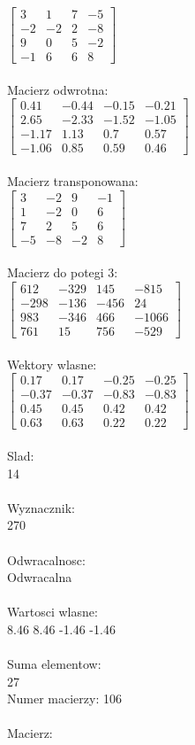 \documentclass[a4paper,12pt]{article}
\begin{document}
$\begin{bmatrix} 3&1&7&-5\\-2&-2&2&-8\\9&0&5&-2\\-1&6&6&8 \end{bmatrix}$
\\
\\
Macierz odwrotna:\\

$\begin{bmatrix} 0.41&-0.44&-0.15&-0.21\\2.65&-2.33&-1.52&-1.05\\-1.17&1.13&0.7&0.57\\-1.06&0.85&0.59&0.46 \end{bmatrix}$
\\
\\
Macierz transponowana:\\

$\begin{bmatrix} 3&-2&9&-1\\1&-2&0&6\\7&2&5&6\\-5&-8&-2&8 \end{bmatrix}$
\\
\\
Macierz do potegi 3:\\

$\begin{bmatrix} 612&-329&145&-815\\-298&-136&-456&24\\983&-346&466&-1066\\761&15&756&-529 \end{bmatrix}$
\\
\\
Wektory wlasne:\\

$\begin{bmatrix} 0.17&0.17&-0.25&-0.25\\-0.37&-0.37&-0.83&-0.83\\0.45&0.45&0.42&0.42\\0.63&0.63&0.22&0.22 \end{bmatrix}$
\\
\\
Slad:\\
14
\\
\\
Wyznacznik:\\
270
\\
\\
Odwracalnosc:\\
Odwracalna
\\
\\
Wartosci wlasne:\\
8.46 8.46 -1.46 -1.46
\\
\\
Suma elementow:\\
27
\\
\newpage
Numer macierzy:
106
\\
\\
Macierz:\\
\end{document}
